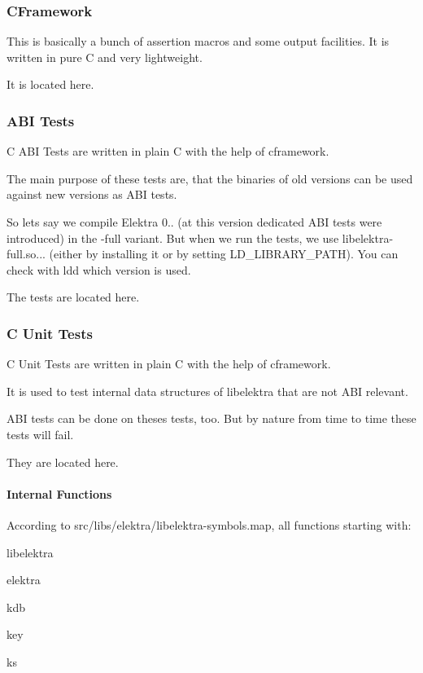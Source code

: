 \subsubsection*{C\+Framework}

This is basically a bunch of assertion macros and some output facilities. It is written in pure C and very lightweight.

It is located here.

\subsubsection*{A\+BI Tests}

C A\+BI Tests are written in plain C with the help of {\ttfamily cframework}.

The main purpose of these tests are, that the binaries of old versions can be used against new versions as A\+BI tests.

So lets say we compile Elektra 0.. (at this version dedicated A\+BI tests were introduced) in the {\ttfamily -\/full} variant. But when we run the tests, we use {\ttfamily libelektra-\/full.\+so...} (either by installing it or by setting {\ttfamily L\+D\+\_\+\+L\+I\+B\+R\+A\+R\+Y\+\_\+\+P\+A\+TH}). You can check with {\ttfamily ldd} which version is used.

The tests are located here.

\subsubsection*{C Unit Tests}

C Unit Tests are written in plain C with the help of {\ttfamily cframework}.

It is used to test internal data structures of libelektra that are not A\+BI relevant.

A\+BI tests can be done on theses tests, too. But by nature from time to time these tests will fail.

They are located here.

\paragraph*{Internal Functions}

According to {\ttfamily src/libs/elektra/libelektra-\/symbols.\+map}, all functions starting with\+:


\begin{DoxyItemize}
\item libelektra
\item elektra
\item kdb
\item key
\item ks
\end{DoxyItemize}

